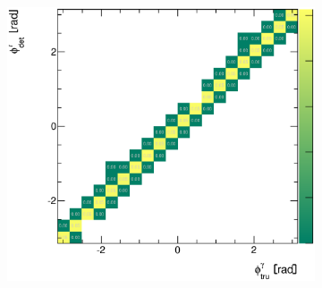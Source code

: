 \documentclass[12pt, twoside]{article}
\numberwithin{equation}{section}
\numberwithin{figure}{section}
\newenvironment{changemargin}[2]{%
\begin{list}{}{%
\setlength{\topsep}{0pt}%
\setlength{\leftmargin}{#1}%
\setlength{\rightmargin}{#2}%
\setlength{\listparindent}{\parindent}%
\setlength{\itemindent}{\parindent}%
\setlength{\parsep}{\parskip}%
}%
\item[]}{\end{list}}
\begin{document}
\begin{figure}
\begin{changemargin}{-1.0cm}{-0.75cm}
\begin{changemargin}{-0.75cm}{-1.0cm}
\begin{subfigure}[b]{0.37\textwidth}
            \subcaption{}
            \label{fig:PythiaCorrelationEtaPhoton}
        \end{subfigure}
        \begin{subfigure}[b]{0.37\textwidth}
            \includegraphics[width=\textwidth]{./images/CorrelationMatricesPythia/REC_vs_HAD(DP+FP)-103.eps}
            \subcaption{}
            \label{fig:PythiaCorrelationPhiPhoton}
        \end{subfigure}


\end{changemargin}
\end{changemargin}
\end{figure}
\end{document}
